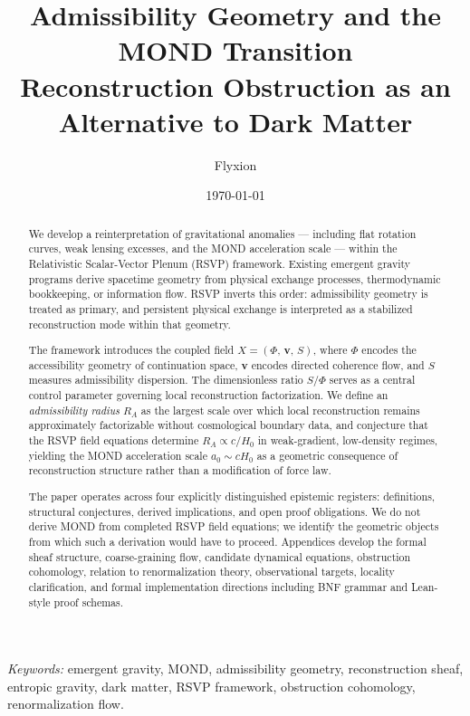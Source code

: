 \documentclass[11pt, a4paper]{article}
\title{%
  \textbf{Admissibility Geometry and the MOND Transition}\\[0.4em]
  \large Reconstruction Obstruction as an Alternative to Dark Matter
}
\author{Flyxion}
\date{\today}
\theoremstyle{plain}
\theoremstyle{definition}
\theoremstyle{remark}
\newcommand{\Xfield}{X = (\Phi,\,\mathbf{v},\,S)}
\newcommand{\RA}{R_{\!A}}
\begin{document}

\maketitle
\thispagestyle{empty}

\begin{abstract}
\noindent
We develop a reinterpretation of gravitational anomalies --- including flat rotation
curves, weak lensing excesses, and the MOND acceleration scale --- within the
Relativistic Scalar-Vector Plenum (RSVP) framework. Existing emergent gravity
programs derive spacetime geometry from physical exchange processes, thermodynamic
bookkeeping, or information flow. RSVP inverts this order: admissibility geometry
is treated as primary, and persistent physical exchange is interpreted as a
stabilized reconstruction mode within that geometry.

The framework introduces the coupled field $\Xfield$, where $\Phi$ encodes the
accessibility geometry of continuation space, $\mathbf{v}$ encodes directed
coherence flow, and $S$ measures admissibility dispersion. The dimensionless ratio
$S/\Phi$ serves as a central control parameter governing local reconstruction
factorization. We define an \emph{admissibility radius} $\RA$ as the largest scale
over which local reconstruction remains approximately factorizable without
cosmological boundary data, and conjecture that the RSVP field equations determine
$\RA \propto c/H_0$ in weak-gradient, low-density regimes, yielding the MOND
acceleration scale $a_0 \sim cH_0$ as a geometric consequence of reconstruction
structure rather than a modification of force law.

The paper operates across four explicitly distinguished epistemic registers:
definitions, structural conjectures, derived implications, and open proof
obligations. We do not derive MOND from completed RSVP field equations; we identify
the geometric objects from which such a derivation would have to proceed. Appendices
develop the formal sheaf structure, coarse-graining flow, candidate dynamical
equations, obstruction cohomology, relation to renormalization theory, observational
targets, locality clarification, and formal implementation directions including BNF
grammar and Lean-style proof schemas.
\end{abstract}

\vspace{1em}
\noindent\textit{Keywords:} emergent gravity, MOND, admissibility geometry,
reconstruction sheaf, entropic gravity, dark matter, RSVP framework, obstruction
cohomology, renormalization flow.
\end{document}
